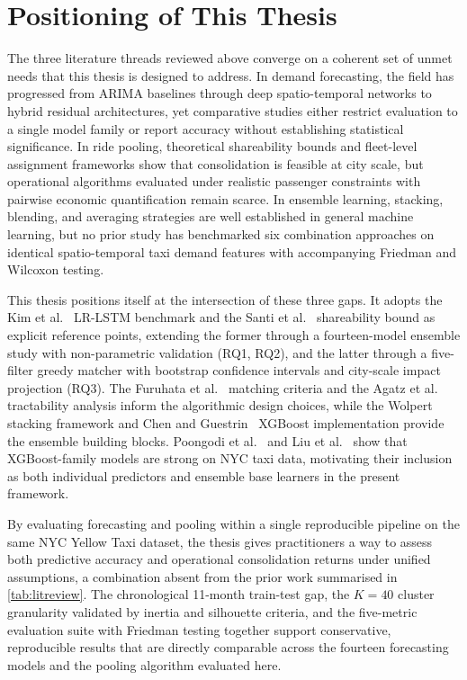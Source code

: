 \section{Positioning of This Thesis}

The three literature threads reviewed above converge on a coherent set of unmet needs that this thesis is designed to address. In demand forecasting, the field has progressed from ARIMA baselines through deep spatio-temporal networks to hybrid residual architectures, yet comparative studies either restrict evaluation to a single model family or report accuracy without establishing statistical significance. In ride pooling, theoretical shareability bounds and fleet-level assignment frameworks show that consolidation is feasible at city scale, but operational algorithms evaluated under realistic passenger constraints with pairwise economic quantification remain scarce. In ensemble learning, stacking, blending, and averaging strategies are well established in general machine learning, but no prior study has benchmarked six combination approaches on identical spatio-temporal taxi demand features with accompanying Friedman and Wilcoxon testing.

This thesis positions itself at the intersection of these three gaps. It adopts the Kim et al.~\parencite{kim2020hybrid} LR-LSTM benchmark and the Santi et al.~\parencite{santi2014quantifying} shareability bound as explicit reference points, extending the former through a fourteen-model ensemble study with non-parametric validation (RQ1, RQ2), and the latter through a five-filter greedy matcher with bootstrap confidence intervals and city-scale impact projection (RQ3). The Furuhata et al.~\parencite{furuhata2013ridesharing} matching criteria and the Agatz et al.~\parencite{agatz2012ridesharing} tractability analysis inform the algorithmic design choices, while the Wolpert~\parencite{wolpert1992stacking} stacking framework and Chen and Guestrin~\parencite{chen2016xgboost} XGBoost implementation provide the ensemble building blocks. Poongodi et al.~\parencite{poongodi2022nyc} and Liu et al.~\parencite{liu2021epidemic} show that XGBoost-family models are strong on NYC taxi data, motivating their inclusion as both individual predictors and ensemble base learners in the present framework.

By evaluating forecasting and pooling within a single reproducible pipeline on the same NYC Yellow Taxi dataset, the thesis gives practitioners a way to assess both predictive accuracy and operational consolidation returns under unified assumptions, a combination absent from the prior work summarised in \autoref{tab:litreview}. The chronological 11-month train-test gap, the $K{=}40$ cluster granularity validated by inertia and silhouette criteria, and the five-metric evaluation suite with Friedman testing together support conservative, reproducible results that are directly comparable across the fourteen forecasting models and the pooling algorithm evaluated here.

